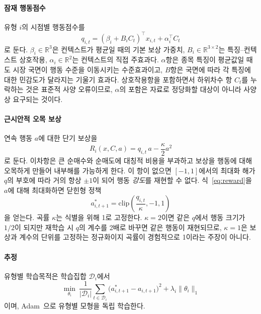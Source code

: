 \paragraph{잠재 행동점수}
유형 $i$의 시점별 행동점수를
\begin{equation}
q_{i,t}=(\beta_i+B_iC_t)^{\top}x_{i,t}+\alpha_i^{\top}C_t
\label{eq:score}
\end{equation}
로 둔다. $\beta_i\in\mathbb{R}^{3}$은 컨텍스트가 평균일 때의 기본 보상 가중치,
$B_i\in\mathbb{R}^{3\times 2}$는 특징--컨텍스트 상호작용,
$\alpha_i\in\mathbb{R}^{2}$는 컨텍스트의 직접 주효과다. $\alpha$항은 종목
특징이 평균값일 때도 시장 국면이 행동 수준을 이동시키는 수준효과이고, $B$항은
국면에 따라 각 특징에 대한 민감도가 달라지는 기울기 효과다. 상호작용항을
포함하면서 하위차수 항 $C_t$를 누락하는 것은 표준적 사양 오류이므로,
$\alpha$의 포함은 자료로 정당화할 대상이 아니라 사양상 요구되는 것이다.

\paragraph{근시안적 오목 보상}
연속 행동 $a$에 대한 단기 보상을
\begin{equation}
R_i(x,C,a)=q_{i,t}\,a-\frac{\kappa}{2}a^{2}
\label{eq:reward}
\end{equation}
로 둔다. 이차항은 큰 순매수와 순매도에 대칭적 비용을 부과하고 보상을 행동에
대해 오목하게 만들어 내부해를 가능하게 한다. 이 항이 없으면 $[-1,1]$에서의
최대화 해가 $q$의 부호에 따라 거의 항상 $\pm1$이 되어 행동 \emph{강도}를
재현할 수 없다. 식~\eqref{eq:reward}을 $a$에 대해 최대화하면 닫힌형 정책
\begin{equation}
a^{*}_{i,t+1}=\mathrm{clip}\!\left(\frac{q_{i,t}}{\kappa},-1,1\right)
\label{eq:policy}
\end{equation}
을 얻는다. 곡률 $\kappa$는 식별을 위해 1로 고정한다. $\kappa=2$이면 같은 $q$에서
행동 크기가 $1/2$이 되지만 재학습 시 $q$의 계수를 2배로 바꾸면 같은 행동이
재현되므로, $\kappa=1$은 보상과 계수의 단위를 고정하는 정규화이지 곡률이
경험적으로 1이라는 주장이 아니다.

\paragraph{추정}
유형별 학습목적은 학습집합 $\mathcal{D}_i$에서
\begin{equation}
\min_{\theta_i}\ \frac{1}{|\mathcal{D}_i|}
\sum_{t\in\mathcal{D}_i}\bigl(a^{*}_{i,t+1}-a_{i,t+1}\bigr)^{2}
+\lambda_i\lVert\theta_i\rVert_1
\label{eq:loss}
\end{equation}
이며, Adam~\cite{kingma2015adam}으로 유형별 모형을 독립 학습한다.

